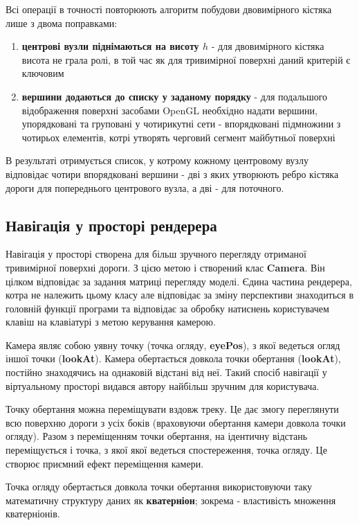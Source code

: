 \documentclass[simple,a4paper,14pt,ukrainian,utf8]{eskdtext}
\begin{document}
		Всі операції в точності повторюють алгоритм побудови двовимірного кістяка лише з двома поправками:
		
		\begin{enumerate}
			\item \textbf{центрові вузли піднімаються на висоту $h$} - для двовимірного кістяка висота не грала ролі, в той час як для тривимірної поверхні даний критерій є ключовим
			\item \textbf{вершини додаються до списку у заданому порядку} - для подальшого відображення поверхні засобами OpenGL необхідно надати вершини, упорядковані та груповані у чотирикутні сети - впорядковані підмножини з чотирьох елементів, котрі утворять черговий сегмент майбутньої поверхні
		\end{enumerate}
		
		В результаті отримується список, у котрому кожному центровому вузлу відповідає чотири впорядковані вершини - дві з яких утворюють ребро кістяка дороги для попереднього центрового вузла, а дві - для поточного.
	
	\subsection{Навігація у просторі рендерера}
	
		Навігація у просторі створена для більш зручного перегляду отриманої тривимірної поверхні дороги. З цією метою і створений клас \textbf{Camera}. Він цілком відповідає за задання матриці перегляду моделі. Єдина частина рендерера, котра не належить цьому класу але відповідає за зміну перспективи знаходиться в головній функції програми та відповідає за обробку натиснень користувачем клавіш на клавіатурі з метою керування камерою.
		
		Камера являє собою уявну точку (точка огляду, \textbf{eyePos}), з якої ведеться огляд іншої точки (\textbf{lookAt}). Камера обертається довкола точки обертання (\textbf{lookAt}), постійно знаходячись на однаковій відстані від неї. Такий спосіб навігації у віртуальному просторі видався автору найбільш зручним для користувача.
		
		Точку обертання можна переміщувати вздовж треку. Це дає змогу переглянути всю поверхню дороги з усіх боків (враховуючи обертання камери довкола точки огляду). Разом з переміщенням точки обертання, на ідентичну відстань переміщується і точка, з якої якої ведеться спостереження, точка огляду. Це створює приємний ефект переміщення камери.
		
		Точка огляду обертається довкола точки обертання використовуючи таку математичну структуру даних як \textbf{кватерніон}; зокрема - властивість множення кватерніонів.
		
\end{document}
